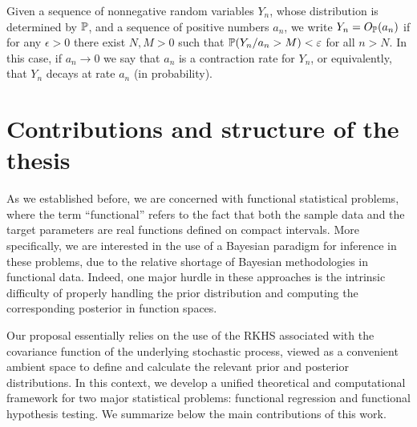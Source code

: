 \begin{definition}\label{def:stochastic-boundedness}
  Given a sequence of nonnegative random variables \(Y_n\), whose distribution is determined by \(\mathbb{P}\), and a sequence of positive numbers \(a_n\), we write \(Y_n=O_{\mathbb{P}}(a_n)\) if for any \(\epsilon>0\) there exist \(N,M>0\) such that \(\mathbb{P}(Y_n/a_n > M) < \varepsilon\) for all \(n> N\). In this case, if \(a_n\to 0\) we say that \(a_n\) is a contraction rate for \(Y_n\), or equivalently, that \(Y_n\) decays at rate \(a_n\) (in probability).
\end{definition}

\section{Contributions and structure of the thesis}

As we established before, we are concerned with functional statistical problems, where the term ``functional'' refers to the fact that both the sample data and the target parameters are real functions defined on compact intervals. More specifically, we are interested in the use of a Bayesian paradigm for inference in these problems, due to the relative shortage of Bayesian methodologies in functional data. Indeed, one major hurdle in these approaches is the intrinsic difficulty of properly handling the prior distribution and computing the corresponding posterior in function spaces.

Our proposal essentially relies on the use of the \acs{RKHS} associated with the covariance function of the underlying stochastic process, viewed as a convenient ambient space to define and calculate the relevant prior and posterior distributions. In this context, we develop a unified theoretical and computational framework for two major statistical problems: functional regression and functional hypothesis testing. We summarize below the main contributions of this work.

